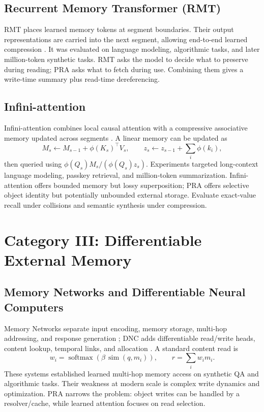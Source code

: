 \documentclass[10pt,a4paper]{article}
\begin{document}
\subsection{Recurrent Memory Transformer (RMT)}
RMT places learned memory tokens at segment boundaries. Their output representations are carried into the next segment, allowing end-to-end learned compression \citep{bulatov2022rmt}. It was evaluated on language modeling, algorithmic tasks, and later million-token synthetic tasks. RMT asks the model to decide what to preserve during reading; PRA asks what to fetch during use. Combining them gives a write-time summary plus read-time dereferencing.

\subsection{Infini-attention}
Infini-attention combines local causal attention with a compressive associative memory updated across segments \citep{munkhdalai2024infini}. A linear memory can be updated as
\begin{equation}
M_s \leftarrow M_{s-1}+\phi(K_s)^\top V_s,\qquad z_s\leftarrow z_{s-1}+\sum_i\phi(k_i),
\end{equation}
then queried using $\phi(Q_s)M_s/(\phi(Q_s)z_s)$. Experiments targeted long-context language modeling, passkey retrieval, and million-token summarization. Infini-attention offers bounded memory but lossy superposition; PRA offers selective object identity but potentially unbounded external storage. Evaluate exact-value recall under collisions and semantic synthesis under compression.

\section{Category III: Differentiable External Memory}
\subsection{Memory Networks and Differentiable Neural Computers}
Memory Networks separate input encoding, memory storage, multi-hop addressing, and response generation \citep{weston2015memory}; DNC adds differentiable read/write heads, content lookup, temporal links, and allocation \citep{graves2016dnc}. A standard content read is
\begin{equation}
w_i=\operatorname{softmax}(\beta\,\operatorname{sim}(q,m_i)),\qquad r=\sum_i w_i m_i.
\end{equation}
These systems established learned multi-hop memory access on synthetic QA and algorithmic tasks. Their weakness at modern scale is complex write dynamics and optimization. PRA narrows the problem: object writes can be handled by a resolver/cache, while learned attention focuses on read selection.
\end{document}

